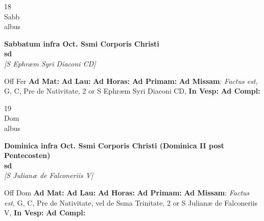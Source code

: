 \documentclass[10pt, openany]{book}
\begin{document}
        \begin{center}
            \begin{minipage}{3.5in}
                \vspace{2em}
                \begin{minipage}{0.5in}
                    {\Huge 18} \\
                    {\normalsize Sabb} \\
                    {\normalsize albus}
                \end{minipage}
                \begin{minipage}{3.0in}
                    \textbf{ \large Sabbatum infra Oct. Ssmi Corporis Christi \\
                    \textnormal{\normalsize sd}} \\ \textit{[S Ephræm Syri Diaconi CD]} \\ 
                \end{minipage}
                \begin{justify}Off Fer
                    \textbf{Ad Mat: }
                    \textbf{Ad Lau: }
                    \textbf{Ad Horas: }
                    \textbf{Ad Primam: }\textbf{Ad Missam}: \textit{Factus est,} G, C, Pre de Nativitate, 2 or S Ephræm Syri Diaconi CD,  
                    \textbf{In Vesp: }
                    \textbf{Ad Compl: }
                \end{justify}
            \end{minipage}
        \end{center}
    
        \begin{center}
            \begin{minipage}{3.5in}
                \vspace{2em}
                \begin{minipage}{0.5in}
                    {\Huge 19} \\
                    {\normalsize Dom} \\
                    {\normalsize albus}
                \end{minipage}
                \begin{minipage}{3.0in}
                    \textbf{ \large Dominica infra Oct. Ssmi Corporis Christi (Dominica II post Pentecosten) \\
                    \textnormal{\normalsize sd}} \\ \textit{[S Julianæ de Falconeriis V]} \\ 
                \end{minipage}
                \begin{justify}Off Dom
                    \textbf{Ad Mat: }
                    \textbf{Ad Lau: }
                    \textbf{Ad Horas: }
                    \textbf{Ad Primam: }\textbf{Ad Missam}: \textit{Factus est,} G, C, Pre de Nativitate, vel de Ssma Trinitate, 2 or S Julianæ de Falconeriis V,  
                    \textbf{In Vesp: }
                    \textbf{Ad Compl: }
                \end{justify}
            \end{minipage}
        \end{center}
    
\end{document}
